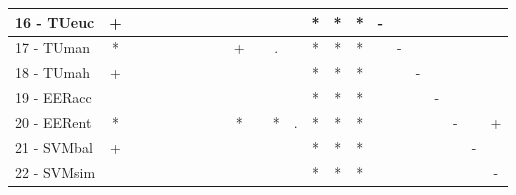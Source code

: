 \begin{table}[h]
\begin{center}
\begin{tabular}{lcc|cc|cc|cc|cc|cc|cc|cc|cc|cc|cc}
16 - TUeuc	& + &   &   &   &   &   &   &   &   &   &   &   & * & * & * & - &   &   &   &   &   &   \\ \hline
17 - TUman	& * &   &   &   &   &   &   &   & + &   & . &   & * & * & * &   & - &   &   &   &   &   \\
18 - TUmah	& + &   &   &   &   &   &   &   &   &   &   &   & * & * & * &   &   & - &   &   &   &   \\ \hline
19 - EERacc	&   &   &   &   &   &   &   &   &   &   &   &   & * & * & * &   &   &   & - &   &   &   \\
20 - EERent	& * &   &   &   &   &   &   &   & * &   & * & . & * & * & * &   &   &   &   & - &   & + \\ \hline
21 - SVMbal	& + &   &   &   &   &   &   &   &   &   &   &   & * & * & * &   &   &   &   &   & - &   \\
22 - SVMsim	&   &   &   &   &   &   &   &   &   &   &   &   & * & * & * &   &   &   &   &   &   & - \\ \hline\end{tabular}

\label{stratsfriedC4.5w}
\end{center}
\end{table}